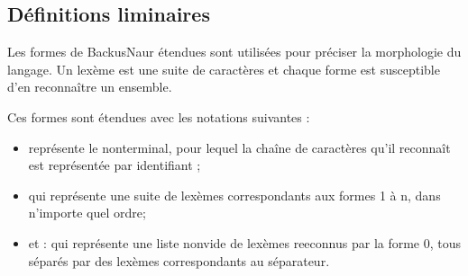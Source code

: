 \documentclass[letterpaper,10pt,french]{sphinxmanual}
\begin{document}
\subsection{Définitions liminaires}
\label{\detokenize{syntax:definitions-liminaires}}
\sphinxAtStartPar
Les formes de Backus\sphinxhyphen{}Naur étendues sont utilisées pour préciser la morphologie
du langage.
Un lexème est une suite de caractères et chaque forme est susceptible d’en
reconnaître un ensemble.

\sphinxAtStartPar
Ces formes sont étendues avec les notations suivantes :
\begin{itemize}
\item {} 
\sphinxAtStartPar
{} représente le non\sphinxhyphen{}terminal, pour lequel la
chaîne de caractères qu’il reconnaît est représentée par identifiant ;

\item {} 
\sphinxAtStartPar
{} qui représente une suite de lexèmes correspondants
aux formes 1 à n, dans n’importe quel ordre;

\item {} 
\sphinxAtStartPar
et :  qui représente une liste non\sphinxhyphen{}vide de lexèmes
reeconnus par la forme 0, tous séparés par des lexèmes correspondants au
séparateur.

\end{itemize}
\end{document}
